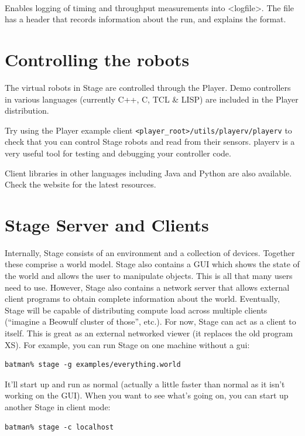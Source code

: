 \documentclass[11pt]{report}
\newenvironment{xarg}[1]{\noindent{\tt #1}\\\hspace*{2em}\begin{minipage}[t]{5in}}{\end{minipage}\vspace*{1em}}
\begin{document}
    \begin{xarg}{-l <logfile>} Enables logging of timing and
    throughput measurements into <logfile>. The file has a header that
    records information about the run, and explains the format.
    \end{xarg}

\section{Controlling the robots}

The virtual robots in Stage are controlled through the Player.  Demo
controllers in various languages (currently C++, C, TCL \& LISP) are
included in the Player distribution.

Try using the Player example client
\verb+<player_root>/utils/playerv/playerv+ to check that you can control
Stage robots and read from their sensors. playerv is a very useful
tool for testing and debugging your controller code.

Client libraries in other languages including Java and Python are also
available. Check the website for the latest resources.

\section{Stage Server and Clients}
Internally, Stage consists of an environment and a collection of
devices. Together these comprise a world model. Stage also contains a
GUI which shows the state of the world and allows the user to
manipulate objects. This is all that many users need to use. However,
Stage also contains a network server that allows external client
programs to obtain complete information about the world. Eventually,
Stage will be capable of distributing compute load across multiple
clients (``imagine a Beowulf cluster of those'', etc.). For now, Stage can
act as a client to itself. This is great as an external networked
viewer (it replaces the old program XS). For example, you can run
Stage on one machine without a gui:

\begin{verbatim}
batman% stage -g examples/everything.world 
\end{verbatim}

It'll start up and run as normal (actually a little faster than normal
as it isn't working on the GUI). When you want to see what's going on, you can start up another Stage in client mode:

\begin{verbatim}
batman% stage -c localhost
\end{verbatim}
\end{document}
